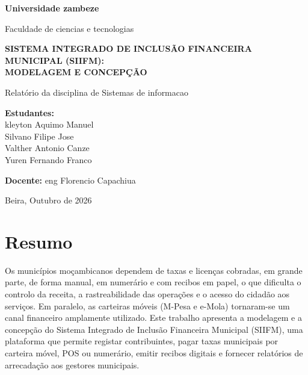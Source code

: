 \documentclass[12pt,a4paper,openany]{report}
\newcommand{\autorA}{kleyton Aquimo Manuel}
\newcommand{\autorB}{Silvano Filipe Jose}
\newcommand{\autorC}{Valther Antonio Canze\\Yuren Fernando Franco}
\begin{document}

\begin{titlepage}
\centering\singlespacing
{\fontsize{14}{17}\selectfont\bfseries Universidade zambeze\par}
{\fontsize{12}{14}\selectfont Faculdade de ciencias e tecnologias\par}
\vspace{3.5cm}
{\fontsize{14}{17}\selectfont\bfseries SISTEMA INTEGRADO DE INCLUSÃO FINANCEIRA MUNICIPAL (SIIFM):\\[4pt] MODELAGEM E CONCEPÇÃO\par}
\vspace{1.2cm}
{\fontsize{12}{14}\selectfont Relatório da disciplina de Sistemas de informacao\par}
\vfill

\begin{flushleft}\fontsize{12}{14}\selectfont
\textbf{Estudantes:}\\ \autorA\\ \autorB\\ \autorC
\end{flushleft}

\vspace{1cm} %

\begin{flushright}\fontsize{12}{14}\selectfont
\textbf{Docente:} eng Florencio Capachiua
\end{flushright}

\vfill
{\fontsize{12}{14}\selectfont Beira, Outubro de 2026\par}
\end{titlepage}

\chapter*{Resumo}
Os municípios moçambicanos dependem de taxas e licenças cobradas, em grande parte, de forma manual, em numerário e com recibos em papel, o que dificulta o controlo da receita, a rastreabilidade das operações e o acesso do cidadão aos serviços. Em paralelo, as carteiras móveis (M-Pesa e e-Mola) tornaram-se um canal financeiro amplamente utilizado. Este trabalho apresenta a modelagem e a concepção do Sistema Integrado de Inclusão Financeira Municipal (SIIFM), uma plataforma que permite registar contribuintes, pagar taxas municipais por carteira móvel, POS ou numerário, emitir recibos digitais e fornecer relatórios de arrecadação aos gestores municipais.
\end{document}
